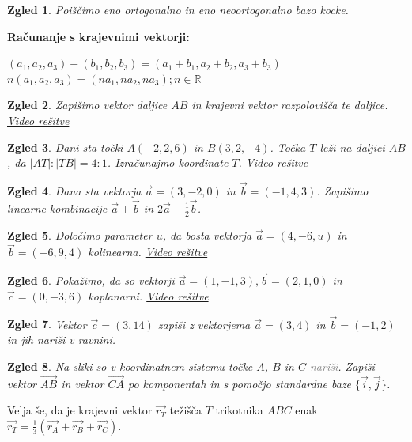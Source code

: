 \documentclass{article}
\newtheorem*{zgled}{Zgled}
\begin{document}
\begin{zgled}
    Poiščimo eno ortogonalno in eno neoortogonalno bazo kocke.
\end{zgled}

\textbf{Računanje s krajevnimi vektorji:}

$(a_1,a_2,a_3)+(b_1,b_2,b_3)=(a_1+b_1,a_2+b_2,a_3+b_3)$\\
$n(a_1,a_2,a_3)=(na_1,na_2,na_3); n\in \mathbb{R}$

\begin{zgled}
    Zapišimo vektor daljice $AB$ in krajevni vektor razpolovišča te daljice. \href{https://youtu.be/KS_ZTJiAqdY}{Video rešitve}
\end{zgled}
\begin{zgled}
    Dani sta točki $A(-2,2,6)$ in $B(3,2,-4)$. Točka $T$ leži na daljici $AB$, da $|AT|:|TB|=4:1$. Izračunajmo koordinate $T$.
    \href{https://youtu.be/I5FE3vhoatk}{Video rešitve}
\end{zgled}

\begin{zgled}
    Dana sta vektorja $\vec{a}=(3,-2,0)$ in $\vec{b}=(-1,4,3)$. Zapišimo linearne kombinacije $\vec{a}+\vec{b}$ in $2\vec{a}-\frac{1}{2}\vec{b}$.
\end{zgled}

\begin{zgled}
    Določimo parameter $u$, da bosta vektorja $\vec{a}=(4,-6,u)$ in $\vec{b}=(-6,9,4)$ kolinearna. \href{https://youtu.be/bGx1agtOIvw}{Video rešitve}
\end{zgled}

\begin{zgled}
    Pokažimo, da so vektorji $\vec{a}=(1,-1,3), \vec{b}=(2,1,0)$ in $\vec{c}=(0,-3,6)$ koplanarni. \href{https://youtu.be/-qfYWHrmi-8}{Video rešitve}
\end{zgled}

\begin{zgled}
    Vektor $\vec{c}=(3,14)$ zapiši z vektorjema $\vec{a}=(3,4)$ in $\vec{b}=(-1,2)$ in jih nariši v ravnini.
\end{zgled}

\begin{zgled}
    Na sliki so v koordinatnem sistemu točke $A$, $B$ in $C$ \textcolor{gray}{nariši}. Zapiši vektor $\vec{AB}$ in vektor $\vec{CA}$ po komponentah in s pomočjo standardne baze $\{\vec{i},\vec{j}\}$.
\end{zgled}

Velja še, da je krajevni vektor $\vec{r_T}$ težišča $T$ trikotnika $ABC$ enak $\vec{r_T}=\frac{1}{3}(\vec{r_A}+\vec{r_B}+\vec{r_C})$.
\end{document}
